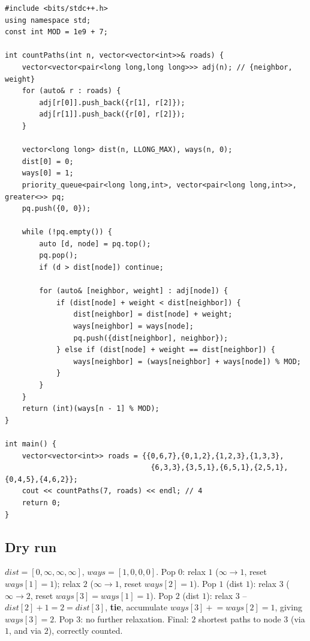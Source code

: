 \begin{lstlisting}
#include <bits/stdc++.h>
using namespace std;
const int MOD = 1e9 + 7;

int countPaths(int n, vector<vector<int>>& roads) {
    vector<vector<pair<long long,long long>>> adj(n); // {neighbor, weight}
    for (auto& r : roads) {
        adj[r[0]].push_back({r[1], r[2]});
        adj[r[1]].push_back({r[0], r[2]});
    }

    vector<long long> dist(n, LLONG_MAX), ways(n, 0);
    dist[0] = 0;
    ways[0] = 1;
    priority_queue<pair<long long,int>, vector<pair<long long,int>>, greater<>> pq;
    pq.push({0, 0});

    while (!pq.empty()) {
        auto [d, node] = pq.top();
        pq.pop();
        if (d > dist[node]) continue;

        for (auto& [neighbor, weight] : adj[node]) {
            if (dist[node] + weight < dist[neighbor]) {
                dist[neighbor] = dist[node] + weight;
                ways[neighbor] = ways[node];
                pq.push({dist[neighbor], neighbor});
            } else if (dist[node] + weight == dist[neighbor]) {
                ways[neighbor] = (ways[neighbor] + ways[node]) % MOD;
            }
        }
    }
    return (int)(ways[n - 1] % MOD);
}

int main() {
    vector<vector<int>> roads = {{0,6,7},{0,1,2},{1,2,3},{1,3,3},
                                  {6,3,3},{3,5,1},{6,5,1},{2,5,1},{0,4,5},{4,6,2}};
    cout << countPaths(7, roads) << endl; // 4
    return 0;
}
\end{lstlisting}

\subsection*{Dry run}


$\textit{dist}=[0,\infty,\infty,\infty]$, $\textit{ways}=[1,0,0,0]$.
Pop $0$: relax $1$ ($\infty\to1$, reset $\textit{ways}[1]=1$); relax
$2$ ($\infty\to1$, reset $\textit{ways}[2]=1$). Pop $1$ (dist $1$):
relax $3$ ($\infty\to2$, reset $\textit{ways}[3]=\textit{ways}[1]=1$).
Pop $2$ (dist $1$): relax $3$ -- $\textit{dist}[2]+1=2=\textit{dist}[3]$,
\textbf{tie}, accumulate $\textit{ways}[3] \mathrel{+}=
\textit{ways}[2]=1$, giving $\textit{ways}[3]=2$. Pop $3$: no further
relaxation. Final: $2$ shortest paths to node $3$ (via $1$, and via
$2$), correctly counted.

